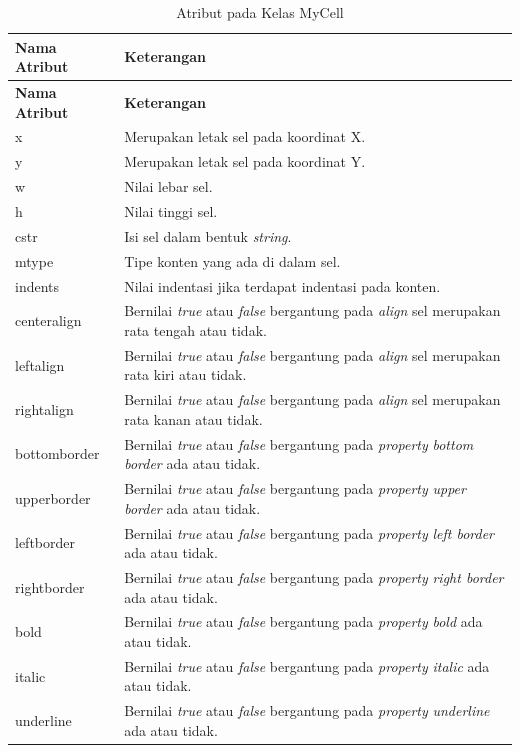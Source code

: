 	\begin{small}
	\begin{longtable}{ | p{3cm} | p{8cm} | }
	    \caption{Atribut pada Kelas MyCell}
	    \label{AtributMyCell}\\ \hline
	    \centering\bfseries{Nama Atribut} & \centering\bfseries{Keterangan} \tabularnewline \hline
	    \endfirsthead
	    \hline
	    \centering\bfseries{Nama Atribut} & \centering\bfseries{Keterangan} \tabularnewline \hline
	    \endhead
	    x & Merupakan letak sel pada koordinat X.\\ \hline
	    y & Merupakan letak sel pada koordinat Y. \\ \hline
	    w & Nilai lebar sel.\\ \hline
	    h & Nilai tinggi sel.\\ \hline
	    cstr & Isi sel dalam bentuk \textit{string}.\\ \hline
	    mtype & Tipe konten yang ada di dalam sel.\\ \hline
	    indents & Nilai indentasi jika terdapat indentasi pada konten.\\ \hline
	    centeralign & Bernilai \textit{true} atau \textit{false} bergantung pada \textit{align} sel merupakan rata tengah atau tidak.\\ \hline
	    leftalign & Bernilai \textit{true} atau \textit{false} bergantung pada \textit{align} sel merupakan rata kiri atau tidak.\\ \hline
	    rightalign & Bernilai \textit{true} atau \textit{false} bergantung pada \textit{align} sel merupakan rata kanan atau tidak.\\ \hline
	    bottomborder & Bernilai \textit{true} atau \textit{false} bergantung pada \textit{property} \textit{bottom border} ada atau tidak.\\ \hline
	    upperborder & Bernilai \textit{true} atau \textit{false} bergantung pada \textit{property} \textit{upper border} ada atau tidak.\\ \hline
	    leftborder & Bernilai \textit{true} atau \textit{false} bergantung pada \textit{property} \textit{left border} ada atau tidak.\\ \hline
	    rightborder & Bernilai \textit{true} atau \textit{false} bergantung pada \textit{property} \textit{right border} ada atau tidak.\\ \hline
	    bold & Bernilai \textit{true} atau \textit{false} bergantung pada \textit{property} \textit{bold} ada atau tidak.\\ \hline
	    italic & Bernilai \textit{true} atau \textit{false} bergantung pada \textit{property} \textit{italic} ada atau tidak.\\ \hline
	    underline & Bernilai \textit{true} atau \textit{false} bergantung pada \textit{property} \textit{underline} ada atau tidak.\\ \hline
	\end{longtable}
	\end{small}

